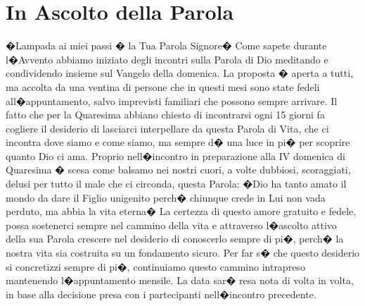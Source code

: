 \section{In Ascolto della Parola}
�Lampada ai miei passi � la Tua Parola Signore�
Come sapete durante l�Avvento abbiamo iniziato degli incontri sulla Parola di Dio meditando e condividendo insieme sul Vangelo della domenica. La proposta � aperta a tutti, ma accolta da una ventina di persone che in questi mesi sono state fedeli all�appuntamento, salvo imprevisti familiari che possono sempre arrivare. Il fatto che per la Quaresima abbiano chiesto di incontrarsi ogni 15 giorni fa cogliere il desiderio di lasciarci interpellare da questa Parola di Vita, che ci incontra dove siamo e come siamo, ma sempre d� una luce in pi� per scoprire quanto Dio ci ama. Proprio nell�incontro in preparazione alla IV domenica di Quaresima � scesa come balsamo nei nostri cuori, a volte dubbiosi, scoraggiati, delusi per tutto il male che ci circonda, questa Parola: �Dio ha tanto amato il mondo da dare il Figlio unigenito perch� chiunque crede in Lui non vada perduto, ma abbia la vita eterna�
La certezza di questo amore gratuito e fedele, possa sostenerci sempre nel cammino della vita e attraverso l�ascolto attivo della sua Parola crescere nel desiderio di conoscerlo sempre di pi�, perch� la nostra vita sia costruita su un fondamento sicuro.
Per far s� che questo desiderio si concretizzi sempre di pi�, continuiamo questo cammino intrapreso mantenendo l�appuntamento mensile. La data sar� resa nota di volta in volta, in base alla decisione presa con i partecipanti nell�incontro precedente.


